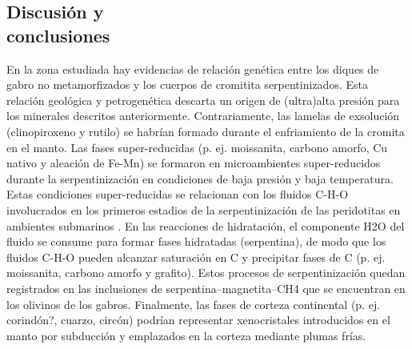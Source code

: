 \documentclass[a4paper,11pt]{article}
\begin{document}
\begin{multicols}{2}
		
		\section{Discusión y \\conclusiones}
		En la zona estudiada hay evidencias de relación genética entre los diques de gabro no metamorfizados y los cuerpos de cromitita serpentinizados. Esta relación geológica y petrogenética descarta un origen de (ultra)alta presión para los minerales descritos anteriormente. Contrariamente, las lamelas de exsolución (clinopiroxeno y rutilo) se habrían formado durante el enfriamiento de la cromita en el manto. Las fases super-reducidas (p. ej. moissanita, carbono amorfo, Cu nativo y aleación de Fe-Mn) se formaron en microambientes super-reducidos durante la serpentinización en condiciones de baja presión y baja temperatura. Estas condiciones super-reducidas se relacionan con los fluidos C-H-O involucrados en los primeros estadios de la serpentinización de las peridotitas en ambientes submarinos \cite{Golubkova}. En las reacciones de hidratación, el componente H2O del fluido se consume para formar fases hidratadas (serpentina), de modo que los fluidos C-H-O pueden alcanzar saturación en C y precipitar fases de C (p. ej. moissanita, carbono amorfo y grafito). Estos procesos de serpentinización quedan registrados en las inclusiones de serpentina–magnetita–CH4 que se encuentran en los olivinos de los gabros. Finalmente, las fases de corteza continental (p. ej. corindón?, cuarzo, circón) podrían representar xenocristales introducidos en el manto por subducción y emplazados en la corteza mediante plumas frías.
	\end{multicols}
	
	
	
	
\end{document}
